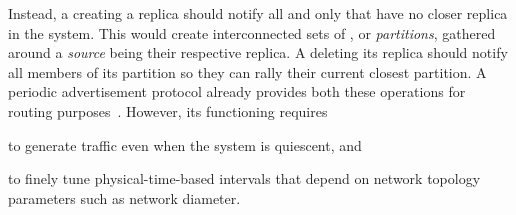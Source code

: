 Instead, a \process creating a replica should notify all and only
\processes that have no closer replica in the system. This would
create interconnected sets of \processes, or \emph{partitions},
gathered around a \emph{source} being their respective replica. A
\process deleting its replica should notify all members of its
partition so they can rally their current closest partition. A
periodic advertisement protocol already provides both these operations
for routing purposes~\cite{hemmati2015namebased}. However, its
functioning requires
\begin{inparaenum}[(i)]
\item to generate traffic even when the system is quiescent, and
\item to finely tune physical-time-based intervals that depend on
  network topology parameters such as network diameter.
\end{inparaenum}


